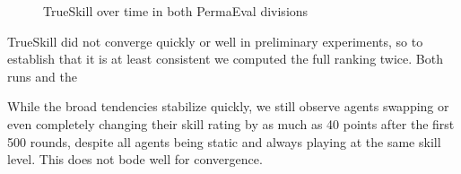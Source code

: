 \begin{figure}[H]
\centering
{}
\caption{TrueSkill over time in both PermaEval divisions}
\label{TrueSkillCompare}
\end{figure}

TrueSkill did not converge quickly or well in preliminary experiments, so to establish that it is at least consistent we computed the full ranking twice. Both runs and the

While the broad tendencies stabilize quickly, we still observe agents swapping or even completely changing their skill rating by as much as 40 points after the first 500 rounds, despite all agents being static and always playing at the same skill level. This does not bode well for convergence.

